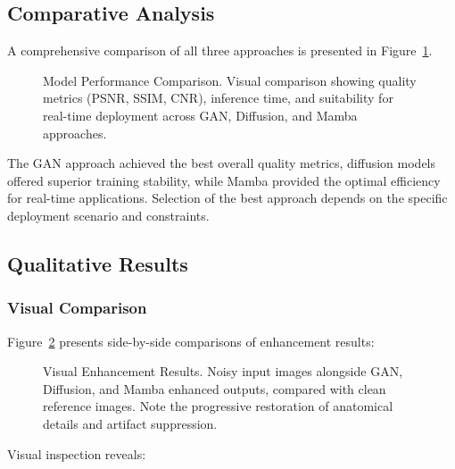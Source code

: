 \documentclass[10pt,conference,letterpaper]{IEEEtran}
\begin{document}
\subsection{Comparative Analysis}

A comprehensive comparison of all three approaches is presented in Figure~\ref{fig:model_comparison}.

\begin{figure}[H]
  \centering
  \fbox{\rule{0pt}{3cm}\rule{4.5cm}{0pt}}
  \caption{Model Performance Comparison. Visual comparison showing quality metrics (PSNR, SSIM, CNR), inference time, and suitability for real-time deployment across GAN, Diffusion, and Mamba approaches.}
  \label{fig:model_comparison}
\end{figure}

The GAN approach achieved the best overall quality metrics, diffusion models offered superior training stability, while Mamba provided the optimal efficiency for real-time applications. Selection of the best approach depends on the specific deployment scenario and constraints.

\subsection{Qualitative Results}

\subsubsection{Visual Comparison}

Figure~\ref{fig:visual_results} presents side-by-side comparisons of enhancement results:

\begin{figure}[H]
  \centering
  \fbox{\rule{0pt}{5cm}\rule{4.5cm}{0pt}}
  \caption{Visual Enhancement Results. Noisy input images alongside GAN, Diffusion, and Mamba enhanced outputs, compared with clean reference images. Note the progressive restoration of anatomical details and artifact suppression.}
  \label{fig:visual_results}
\end{figure}

Visual inspection reveals:
\end{document}
